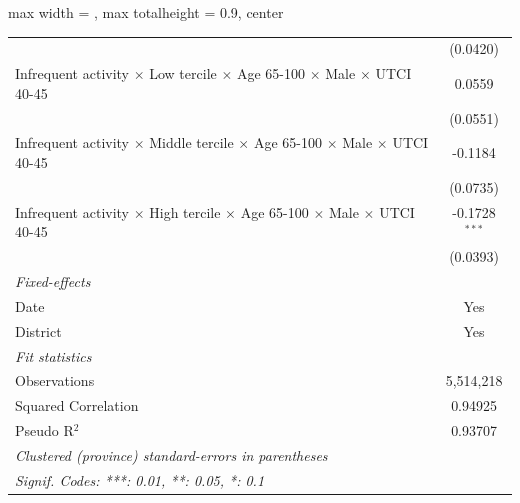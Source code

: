 \begin{table}[htbp]
\begin{adjustbox}{max width = \textwidth, max totalheight = 0.9\textheight, center}
\begin{tabular}{lc}
                                                                                                                 & (0.0420)\\   
         Infrequent activity $\times$ Low tercile $\times$ Age 65-100 $\times$ Male $\times$ UTCI 40-45          & 0.0559\\   
                                                                                                                 & (0.0551)\\   
         Infrequent activity $\times$ Middle tercile $\times$ Age 65-100 $\times$ Male $\times$ UTCI 40-45       & -0.1184\\   
                                                                                                                 & (0.0735)\\   
         Infrequent activity $\times$ High tercile $\times$ Age 65-100 $\times$ Male $\times$ UTCI 40-45         & -0.1728$^{***}$\\   
                                                                                                                 & (0.0393)\\   
         \midrule
         \emph{Fixed-effects}\\
         Date                                                                                                    & Yes\\  
         District                                                                                                & Yes\\  
         \midrule
         \emph{Fit statistics}\\
         Observations                                                                                            & 5,514,218\\  
         Squared Correlation                                                                                     & 0.94925\\  
         Pseudo R$^2$                                                                                            & 0.93707\\  
         \midrule \midrule
         \multicolumn{2}{l}{\emph{Clustered (province) standard-errors in parentheses}}\\
         \multicolumn{2}{l}{\emph{Signif. Codes: ***: 0.01, **: 0.05, *: 0.1}}\\
      \end{tabular}
   \end{adjustbox}
\end{table}


